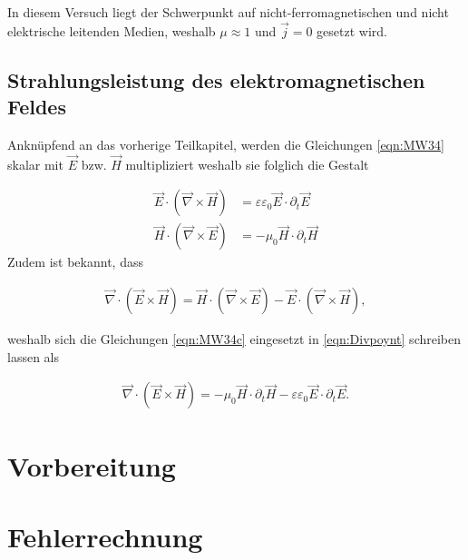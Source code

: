 \noindent In diesem Versuch liegt der Schwerpunkt auf nicht-ferromagnetischen und nicht elektrische leitenden Medien, weshalb $\mu \approx 1$ und $\vec{j} = 0$
gesetzt wird.  

\subsection{Strahlungsleistung des elektromagnetischen Feldes}

Anknüpfend an das vorherige Teilkapitel, werden die Gleichungen \ref{eqn:MW34} skalar mit $\vec{E}$ bzw. $\vec{H}$ multipliziert weshalb sie folglich die Gestalt 

\begin{align}
\label{eqn:MW34c}
    \vec{E}\cdot\left(\vec{\nabla}\times\vec{H}\right) &= \varepsilon\varepsilon_0\vec{E}\cdot\partial_{t}\vec{E}\\
    \vec{H}\cdot\left(\vec{\nabla}\times\vec{E}\right) &= -\mu_0\vec{H}\cdot\partial_{t}\vec{H}
\end{align}
\newpage
\noindent Zudem ist bekannt, dass

\begin{align}
    \vec{\nabla}\cdot\left(\vec{E}\times\vec{H}\right) = \vec{H}\cdot\left(\vec{\nabla}\times\vec{E}\right) - \vec{E}\cdot\left(\vec{\nabla}\times\vec{H}\right),
    \label{eqn:Divpoynt}
\end{align}

\noindent weshalb sich die Gleichungen \ref{eqn:MW34c} eingesetzt in \ref{eqn:Divpoynt} schreiben lassen als

\begin{align}
\label{eqn:Divpoyntzsm}
    \vec{\nabla}\cdot\left(\vec{E}\times\vec{H}\right) = -\mu_0\vec{H}\cdot\partial_t\vec{H} - \varepsilon\varepsilon_0\vec{E}\cdot\partial_t\vec{E}.
\end{align}


\section{Vorbereitung}

\section{Fehlerrechnung}
